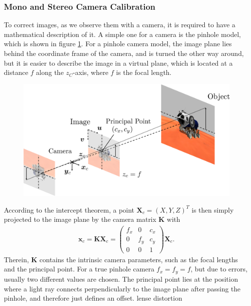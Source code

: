 \subsubsection{Mono and Stereo Camera Calibration}
To correct images, as we observe them with a camera, it is required to have a mathematical description of it. A simple one for a camera is the pinhole model, which is shown in figure \ref{fig::323_pin_hole_camera}. For a pinhole camera model, the image plane lies behind the coordinate frame of the camera, and is turned the other way around, but it is easier to describe the image in a virtual plane, which is located at a distance $f$ along the $z_C$-axis, where $f$ is the focal length.
\begin{figure}[h]
	\centering
	\includegraphics[scale=.28]{chapters/03_background/img/pin_hole_camera.png}
	\label{fig::323_pin_hole_camera}
\end{figure}
According to the intercept theorem, a point $\bm{X}_c = (X,Y,Z)^T$ is then simply projected to the image plane by the camera matrix $\bm{K}$ with
\begin{align}
	\bm{x}_c = \bm{K}\bm{X}_c = \begin{pmatrix}
	f_x & 0   & c_x \\
	0   & f_y & c_y \\
	0   & 0   & 1
	\end{pmatrix}\bm{X}_c.
\end{align}
Therein, $\bm{K}$ contains the intrinsic camera parameters, such as the focal lengths and the principal point. For a true pinhole camera $f_x = f_y =f$, but due to errors, usually two different values are chosen. The principal point lies at the position where a light ray connects perpendicularly to the image plane after passing the pinhole, and therefore just defines an offset. 
\cite{duane1971close} lense distortion\\
